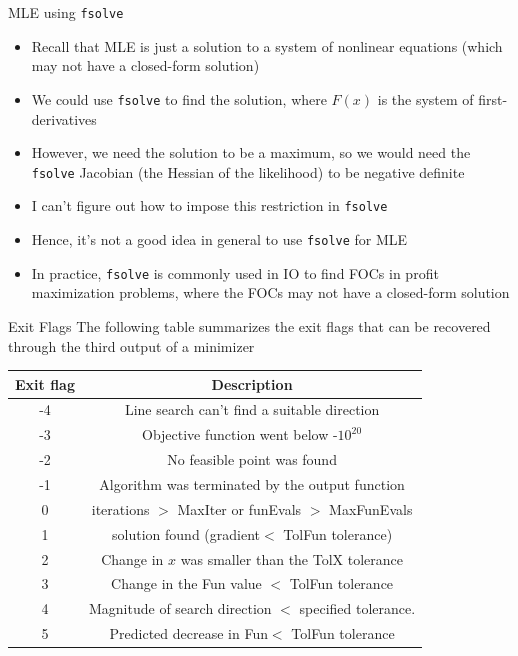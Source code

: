 \documentclass[english,xcolor=dvipsnames]{beamer}
\begin{document}
\begin{frame}{MLE using \texttt{fsolve}}
\begin{itemize}
	\item Recall that MLE is just a solution to a system of nonlinear equations (which may not have a closed-form solution)
	\item We could use \texttt{fsolve} to find the solution, where $F\left(x\right)$ is the system of first-derivatives
	\item However, we need the solution to be a maximum, so we would need the \texttt{fsolve} Jacobian (the Hessian of the likelihood) to be negative definite
	\item I can't figure out how to impose this restriction in \texttt{fsolve}
	\item Hence, it's not a good idea in general to use \texttt{fsolve} for MLE
	\item In practice, \texttt{fsolve} is commonly used in IO to find FOCs in profit maximization problems, where the FOCs may not have a closed-form solution
\end{itemize}
\end{frame}

\begin{frame}{Exit Flags}
The following table summarizes the exit flags that can be recovered through the third output of a minimizer
\begin{center}
\begin{tabular}{|c|c|}
\hline 
Exit flag & Description\\
\hline 
-4 & Line search can't find a suitable direction\\
\hline 
-3 & Objective function went below -$10^{20}$\\
\hline 
-2 & No feasible point was found\\
\hline 
-1 & Algorithm was terminated by the output function\\
\hline 
0 & iterations $>$ MaxIter or funEvals $>$ MaxFunEvals\\
\hline 
1 & solution found (gradient$<$ TolFun tolerance)\\
\hline 
2 & Change in $x$ was smaller than the TolX tolerance\\
\hline 
3 & Change in the Fun value $<$ TolFun tolerance\\
\hline 
4 & Magnitude of search direction $<$ specified tolerance.\\
\hline 
5 & Predicted decrease in Fun$<$ TolFun tolerance\\
\hline 
\end{tabular}
\end{center}
\end{frame}
\end{document}
